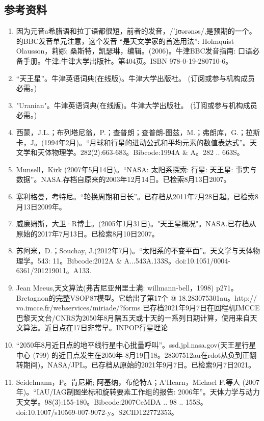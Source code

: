 \subsection{参考资料}
\begin{enumerate}
\item 因为元音a希腊语和拉丁语都很短，前者的发音，/ˈjʊərənəs/,是预期的一个。的BBC发音单元注意，这个发音 “是天文学家的首选用法”: Holmquist Olausson，莉娜; 桑斯特，凯瑟琳，编辑。(2006)。牛津BBC发音指南: 口语必备手册。牛津:牛津大学出版社。第404页。ISBN 978-0-19-280710-6。
\item “天王星”。牛津英语词典(在线版)。牛津大学出版社。 (订阅或参与机构成员必需。)
\item "Uranian"。牛津英语词典(在线版)。牛津大学出版社。 (订阅或参与机构成员必需。)
\item 西蒙，J.L.；布列塔尼翁，P.；查普朗；查普朗-图兹，M.；弗朗库，G.；拉斯卡，J。(1994年2月)。“月球和行星的进动公式和平均元素的数值表达式”。天文学和天体物理学。282(2):663-683。Bibcode:1994A & A。282 .. 663S。
\item Munsell，Kirk (2007年5月14日)。“NASA: 太阳系探索: 行星: 天王星: 事实与数据”。NASA.存档自原来的2003年12月14日。已检索8月13日2007。
\item 塞利格曼，考特尼。“轮换周期和日长”。已存档从2011年7月28日起。已检索8月13日2009年。
\item 威廉姆斯，大卫·R博士。(2005年1月31日)。"天王星概况"。NASA.已存档从原始的2017年7月13日。已检索8月10日2007。
\item 苏阿米，D.；Souchay, J.(2012年7月)。“太阳系的不变平面”。天文学与天体物理学。543: 11。Bibcode:2012A & A...543A.133S。doi:10.1051/0004-6361/201219011。A133.
\item Jean Meeus,天文算法(弗吉尼亚州里士满: willmann-bell，1998) p271。Bretagnon的完整VSOP87模型。它给出了第17个 @ 18.283075301au。http:// vo.imcce.fr/webservices/miriade/?forms 已存档2021年9月7日在回程机IMCCE巴黎天文台/CNRS为2050年8月隔五天或十天的一系列日期计算，使用来自天文算法。近日点在17日非常早。INPOP行星理论
\item “2050年8月近日点的地平线行星中心批量呼叫”。ssd.jpl.nasa.gov(天王星行星中心 (799) 的近日点发生在2050年-8月19日18。28307512au在rdot从负到正翻转期间)。NASA/JPL。已存档从原始的2021年9月7日。已检索9月7日2021。
\item Seidelmann，P。肯尼斯; 阿基纳，布伦特A；A'Hearn，Michael F.等人 (2007年)。“IAU/IAG制图坐标和旋转要素工作组的报告: 2006年”。天体力学与动力天文学。98(3):155-180。Bibcode:2007CeMDA .. 98 .. 155S。doi:10.1007/s10569-007-9072-y。S2CID122772353。  

\end{enumerate}
